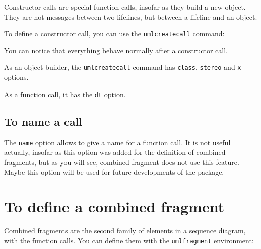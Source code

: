 \documentclass[a4paper,11pt]{report}
\begin{document}
Constructor calls are special function calls, insofar as they build a new object. They are not messages between two lifelines, but between a lifeline and an object.

To define a constructor call, you can use the {\tt umlcreatecall} command:

\medskip

\begin{minipage}{0.5\textwidth}

\end{minipage}
\begin{minipage}{0.5\textwidth}
\begin{center}
\end{center}
\end{minipage}

\medskip

You can notice that everything behave normally after a constructor call.

\medskip

As an object builder, the {\tt umlcreatecall} command has {\tt class}, {\tt stereo} and {\tt x} options.

As a function call, it has the {\tt dt} option.

\subsection{To name a call}\label{ss.callname}

The {\tt name} option allows to give a name for a function call. It is not useful actually, insofar as this option was added for the definition of combined fragments, but as you will see, combined fragment does not use this feature. Maybe this option will be used for future developments of the package.

\section{To define a combined fragment}\label{s.fragments}

Combined fragments are the second family of elements in a sequence diagram, with the function calls. You can define them with the {\tt umlfragment} environment:

\medskip

\begin{minipage}{0.5\textwidth}

\end{minipage}
\begin{minipage}{0.5\textwidth}
\begin{center}
\end{center}
\end{minipage}
\end{document}
